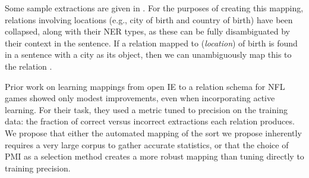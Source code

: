 Some sample extractions are given in .
For the purposes of creating this mapping, relations involving
  locations (e.g., city of birth and country of birth) have been collapsed,
  along with their NER types, as these can be fully disambiguated by their
  context in the sentence.
If a relation mapped to (\textit{location}) of birth is found in a sentence
  with a city as its object, then we can unambiguously map this to the relation
  .
  
Prior work on learning mappings from open IE to a relation schema for NFL
  games \cite{key:2010soderland-nfl} showed only modest improvements, even
  when incorporating active learning.
For their task, they used a metric tuned to precision on the training data:
  the fraction of correct versus incorrect extractions each relation produces.
We propose that either the automated mapping of the sort we propose inherently
  requires a very large corpus to gather accurate statistics, or that the
  choice of PMI as a selection method creates a more robust mapping than tuning
  directly to training precision.

